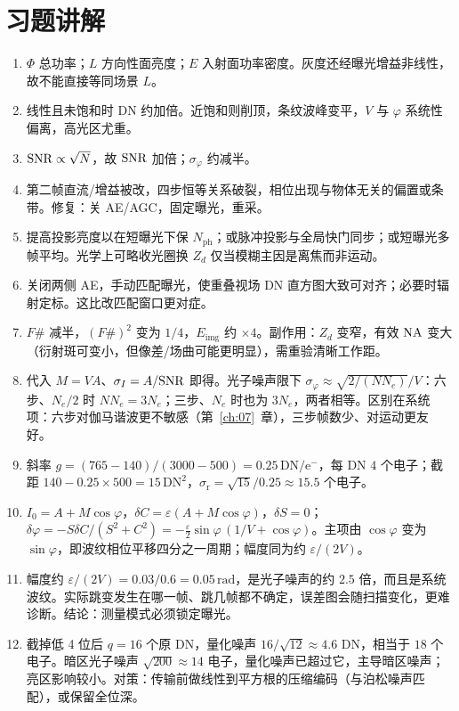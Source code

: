 \section{习题讲解}
\label{sec:ch05-solutions}

\begin{enumerate}
  \item $\Phi$ 总功率；$L$ 方向性面亮度；$E$ 入射面功率密度。灰度还经曝光增益非线性，故不能直接等同场景 $L$。
  \item 线性且未饱和时 DN 约加倍。近饱和则削顶，条纹波峰变平，$V$ 与 $\varphi$ 系统性偏离，高光区尤重。
  \item $\mathrm{SNR}\propto\sqrt{N}$，故 $\mathrm{SNR}$ 加倍；$\sigma_{\varphi}$ 约减半。
  \item 第二帧直流/增益被改，四步恒等关系破裂，相位出现与物体无关的偏置或条带。修复：关 AE/AGC，固定曝光，重采。
  \item 提高投影亮度以在短曝光下保 $N_{\mathrm{ph}}$；或脉冲投影与全局快门同步；或短曝光多帧平均。光学上可略收光圈换 $Z_d$ 仅当模糊主因是离焦而非运动。
  \item 关闭两侧 AE，手动匹配曝光，使重叠视场 DN 直方图大致可对齐；必要时辐射定标。这比改匹配窗口更对症。
  \item $F\#$ 减半，$(F\#)^{2}$ 变为 $1/4$，$E_{\mathrm{img}}$ 约 $\times4$。副作用：$Z_d$ 变窄，有效 $\mathrm{NA}$ 变大（衍射斑可变小，但像差/场曲可能更明显），需重验清晰工作距。
  \item 代入 $M=VA$、$\sigma_I=A/\mathrm{SNR}$ 即得。光子噪声限下 $\sigma_\varphi\approx\sqrt{2/(NN_e)}/V$：六步、$N_e/2$ 时 $NN_e=3N_e$；三步、$N_e$ 时也为 $3N_e$，两者相等。区别在系统项：六步对伽马谐波更不敏感（第~\ref{ch:07}~章），三步帧数少、对运动更友好。
  \item 斜率 $g=(765-140)/(3000-500)=0.25\,\mathrm{DN/e^-}$，每 DN $4$ 个电子；截距 $140-0.25\times500=15\,\mathrm{DN^2}$，$\sigma_{\mathrm r}=\sqrt{15}/0.25\approx15.5$ 个电子。
  \item $I_0=A+M\cos\varphi$，$\delta C=\varepsilon(A+M\cos\varphi)$，$\delta S=0$；$\delta\varphi=-S\delta C/(S^2+C^2)=-\frac{\varepsilon}{2}\sin\varphi\,(1/V+\cos\varphi)$。主项由 $\cos\varphi$ 变为 $\sin\varphi$，即波纹相位平移四分之一周期；幅度同为约 $\varepsilon/(2V)$。
  \item 幅度约 $\varepsilon/(2V)=0.03/0.6=0.05\,\mathrm{rad}$，是光子噪声的约 $2.5$ 倍，而且是系统波纹。实际跳变发生在哪一帧、跳几帧都不确定，误差图会随扫描变化，更难诊断。结论：测量模式必须锁定曝光。
  \item 截掉低 4 位后 $q=16$ 个原 DN，量化噪声 $16/\sqrt{12}\approx4.6$ DN，相当于 $18$ 个电子。暗区光子噪声 $\sqrt{200}\approx14$ 电子，量化噪声已超过它，主导暗区噪声；亮区影响较小。对策：传输前做线性到平方根的压缩编码（与泊松噪声匹配），或保留全位深。
\end{enumerate}
